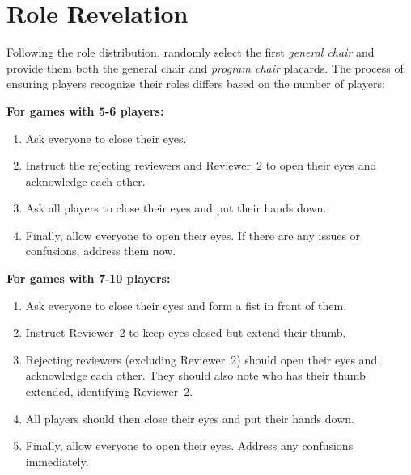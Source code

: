 \documentclass[sigplan,screen,nonacm]{acmart}
\begin{document}


\section{Role Revelation}

Following the role distribution, randomly select the first \textit{general chair} and provide them both the general chair and \textit{program chair} placards.
The process of ensuring players recognize their roles differs based on the number of players:

\textbf{For games with 5-6 players:}
\begin{enumerate}
	\item Ask everyone to close their eyes.
	\item Instruct the rejecting reviewers and Reviewer~2 to open their eyes and acknowledge each other.
	\item Ask all players to close their eyes and put their hands down.
	\item Finally, allow everyone to open their eyes. If there are any issues or confusions, address them now.
\end{enumerate}

\textbf{For games with 7-10 players:}
\begin{enumerate}
	\item Ask everyone to close their eyes and form a fist in front of them.
	\item Instruct Reviewer~2 to keep eyes closed but extend their thumb.
	\item Rejecting reviewers (excluding Reviewer~2) should open their eyes and acknowledge each other. They should also note who has their thumb extended, identifying Reviewer~2.
	\item All players should then close their eyes and put their hands down.
	\item Finally, allow everyone to open their eyes. Address any confusions immediately.
\end{enumerate}
\end{document}
